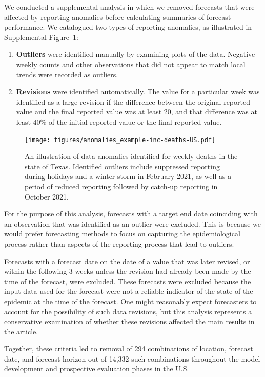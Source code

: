 \documentclass{article}
\begin{document}
We conducted a supplemental analysis in which we removed forecasts that were affected by reporting anomalies before calculating summaries of forecast performance. We catalogued two types of reporting anomalies, as illustrated in Supplemental Figure~\ref{fig:anomalies_example}:
\begin{enumerate}
    \item \textbf{Outliers} were identified manually by examining plots of the data. Negative weekly counts and other observations that did not appear to match local trends were recorded as outliers.
    \item \textbf{Revisions} were identified automatically. The value for a particular week was identified as a large revision if the difference between the original reported value and the final reported value was at least 20, and that difference was at least 40\% of the initial reported value or the final reported value.
\end{enumerate}

\begin{figure}
  \texttt{[image: figures/anomalies\_example-inc-deaths-US.pdf]}
  \caption{An illustration of data anomalies identified for weekly deaths in the state of Texas. Identified outliers include suppressed reporting during holidays and a winter storm in February 2021, as well as a period of reduced reporting followed by catch-up reporting in October 2021.}
  \label{fig:anomalies_example}
\end{figure}

For the purpose of this analysis, forecasts with a target end date coinciding with an observation that was identified as an outlier were excluded. This is because we would prefer forecasting methods to focus on capturing the epidemiological process rather than aspects of the reporting process that lead to outliers.

Forecasts with a forecast date on the date of a value that was later revised, or within the following 3 weeks unless the revision had already been made by the time of the forecast, were excluded. These forecasts were excluded because the input data used for the forecast were not a reliable indicator of the state of the epidemic at the time of the forecast. One might reasonably expect forecasters to account for the possibility of such data revisions, but this analysis represents a conservative examination of whether these revisions affected the main results in the article.

Together, these criteria led to removal of 294 combinations of location, forecast date, and forecast horizon out of 14,332 such combinations throughout the model development and prospective evaluation phases in the U.S.
\end{document}
